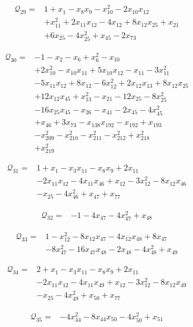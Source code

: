 \begin{align*}
\mathcal{Q}_{29}={}&1+x_{1}-x_{8}x_{9}-x_{10}^{2}-2x_{10}x_{12}\\
&+x_{11}^{2}+2x_{11}x_{12}-4x_{12}+8x_{12}x_{25}+x_{21}\\
&+6x_{25}-4x_{25}^{2}+x_{45}-2x_{73}
\end{align*}

\begin{align*}
\mathcal{Q}_{30}={}&-1-x_{2}-x_{6}+x_{6}^{2}-x_{10}\\
&+2x_{10}^{2}-x_{10}x_{11}+5x_{10}x_{12}-x_{11}-3x_{11}^{2}\\
&-5x_{11}x_{12}+8x_{12}-6x_{12}^{2}+2x_{12}x_{13}+8x_{12}x_{25}\\
&+12x_{12}x_{45}+x_{13}^{2}-x_{21}-12x_{25}-8x_{25}^{2}\\
&-16x_{25}x_{45}-x_{26}-x_{41}-2x_{45}-4x_{45}^{2}\\
&+x_{46}+3x_{73}-x_{138}x_{192}-x_{192}+x_{193}\\
&-x_{209}^{2}-x_{210}^{2}-x_{211}^{2}-x_{212}^{2}+x_{218}^{2}\\
&+x_{219}^{2}
\end{align*}

\begin{align*}
\mathcal{Q}_{31}={}&1+x_{1}-x_{3}x_{11}-x_{8}x_{9}+2x_{11}\\
&-2x_{11}x_{12}-4x_{11}x_{46}+x_{12}-3x_{12}^{2}-8x_{12}x_{46}\\
&-x_{25}-4x_{46}^{2}+x_{47}+x_{77}
\end{align*}

\begin{align*}
\mathcal{Q}_{32}={}&-1-4x_{47}-4x_{47}^{2}+x_{48}
\end{align*}

\begin{align*}
\mathcal{Q}_{33}={}&1-x_{12}^{2}-8x_{12}x_{47}-4x_{12}x_{48}+8x_{47}\\
&-8x_{47}^{2}-16x_{47}x_{48}-2x_{48}-4x_{48}^{2}+x_{49}
\end{align*}

\begin{align*}
\mathcal{Q}_{34}={}&2+x_{1}-x_{3}x_{11}-x_{8}x_{9}+2x_{11}\\
&-2x_{11}x_{12}-4x_{11}x_{49}+x_{12}-3x_{12}^{2}-8x_{12}x_{49}\\
&-x_{25}-4x_{49}^{2}+x_{50}+x_{77}
\end{align*}

\begin{align*}
\mathcal{Q}_{35}={}&-4x_{44}^{2}-8x_{44}x_{50}-4x_{50}^{2}+x_{51}
\end{align*}

